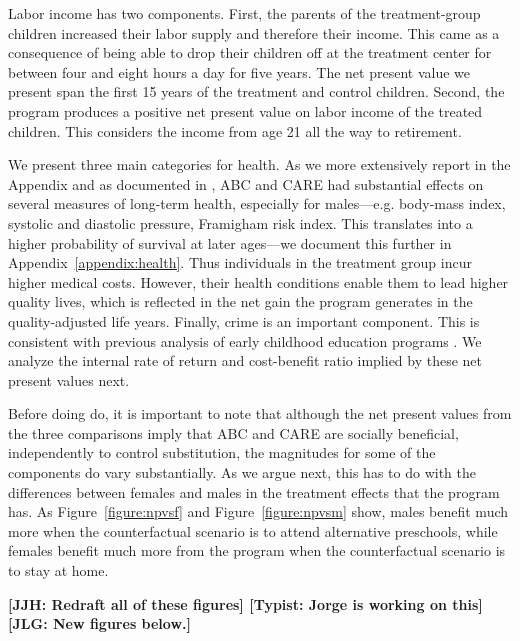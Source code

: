 Labor income has two components. First, the parents of the treatment-group children increased their labor supply and therefore their income. This came as a consequence of being able to drop their children off at the treatment center for between four and eight hours a day for five years. The net present value we present span the first 15 years of the treatment and control children. Second, the program produces a positive net present value on labor income of the treated children. This considers the income from age 21 all the way to retirement.

We present three main categories for health. As we more extensively report in the Appendix and as documented in \citet{Campbell_Conti_etal_2014_EarlyChildhoodInvestments}, ABC and CARE had substantial effects on several measures of long-term health, especially for males---e.g. body-mass index, systolic and diastolic pressure, Framigham risk index. This translates into a higher probability of survival at later ages---we document this further in Appendix~\ref{appendix:health}. Thus individuals in the treatment group incur higher medical costs. However, their health conditions enable them to lead higher quality lives, which is reflected in the net gain the program generates in the quality-adjusted life years. Finally, crime is an important component. This is consistent with previous analysis of early childhood education programs \citep{Heckman_Moon_etal_2010_RateofReturn}. We analyze the internal rate of return and cost-benefit ratio implied by these net present values next.

Before doing do, it is important to note that although the net present values from the three comparisons imply that ABC and CARE are socially beneficial, independently to control substitution, the magnitudes for some of the components do vary substantially. As we argue next, this has to do with the differences between females and males in the treatment effects that the program has. As Figure~\ref{figure:npvsf} and Figure~\ref{figure:npvsm} show, males benefit much more when the counterfactual scenario is to attend alternative preschools, while females benefit much more from the program when the counterfactual scenario is to stay at home.

\textbf{[JJH: Redraft all of these figures] [Typist: Jorge is working on this] [JLG: New figures below.]}

